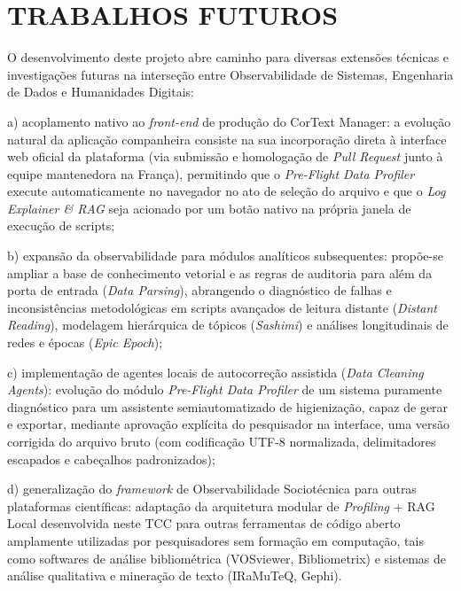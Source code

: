 \documentclass[
	oneside,
	a4paper,
	12pt,
	chapter=TITLE,
	section=TITLE,
	english,
	brazilian
]{abntex2}
\begin{document}
\FloatBarrier
\section{TRABALHOS FUTUROS}\label{sec:trabalhos_futuros}


O desenvolvimento deste projeto abre caminho para diversas extensões técnicas e investigações futuras na interseção entre Observabilidade de Sistemas, Engenharia de Dados e Humanidades Digitais:

\par\indent a) acoplamento nativo ao \textit{front-end} de produção do CorText Manager: a evolução natural da aplicação companheira consiste na sua incorporação direta à interface web oficial da plataforma (via submissão e homologação de \textit{Pull Request} junto à equipe mantenedora na França), permitindo que o \textit{Pre-Flight Data Profiler} execute automaticamente no navegador no ato de seleção do arquivo e que o \textit{Log Explainer \& RAG} seja acionado por um botão nativo na própria janela de execução de scripts;
\par\indent b) expansão da observabilidade para módulos analíticos subsequentes: propõe-se ampliar a base de conhecimento vetorial e as regras de auditoria para além da porta de entrada (\textit{Data Parsing}), abrangendo o diagnóstico de falhas e inconsistências metodológicas em scripts avançados de leitura distante (\textit{Distant Reading}), modelagem hierárquica de tópicos (\textit{Sashimi}) \cite{Abdo2021} e análises longitudinais de redes e épocas (\textit{Epic Epoch});
\par\indent c) implementação de agentes locais de autocorreção assistida (\textit{Data Cleaning Agents}): evolução do módulo \textit{Pre-Flight Data Profiler} de um sistema puramente diagnóstico para um assistente semiautomatizado de higienização, capaz de gerar e exportar, mediante aprovação explícita do pesquisador na interface, uma versão corrigida do arquivo bruto (com codificação UTF-8 normalizada, delimitadores escapados e cabeçalhos padronizados);
\par\indent d) generalização do \textit{framework} de Observabilidade Sociotécnica para outras plataformas científicas: adaptação da arquitetura modular de \textit{Profiling} + RAG Local desenvolvida neste TCC para outras ferramentas de código aberto amplamente utilizadas por pesquisadores sem formação em computação, tais como softwares de análise bibliométrica (VOSviewer, Bibliometrix) e sistemas de análise qualitativa e mineração de texto (IRaMuTeQ, Gephi).
\end{document}
